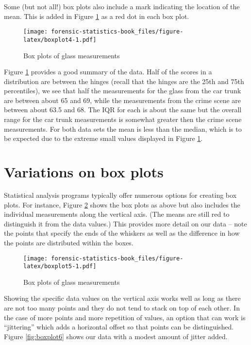 \documentclass[
]{book}
\begin{document}
Some (but not all!) box plots also include a mark indicating the location of
the mean. This is added in Figure \ref{fig:boxplot4} as a red dot in each
box plot.

\begin{figure}
\centering
\texttt{[image: forensic-statistics-book\_files/figure-latex/boxplot4-1.pdf]}
\caption{\label{fig:boxplot4}Box plots of glass measurements}
\end{figure}

Figure \ref{fig:boxplot4} provides a good summary of the data. Half of
the scores in a distribution are between the hinges (recall that the hinges are
the 25th and 75th percentiles), we see that half the measurements for the glass
from the car trunk are between about 65 and 69, while the measurements from the
crime scene are between about 63.5 and 68. The IQR for each is about the same
but the overall range for the car trunk measurements is somewhat greater
then the crime scene measurements. For both data sets the mean is less than
the median, which is to be expected due to the extreme small values displayed
in Figure \ref{fig:boxplot4}.

\hypertarget{variations-on-box-plots}{%
\section{Variations on box plots}\label{variations-on-box-plots}}

Statistical analysis programs typically offer numerous options for creating
box plots. For instance, Figure \ref{fig:boxplot5} shows the box plots
as above but also includes the individual measurements along the vertical
axis. (The means are still red to distinguish it from the data values.)
This provides more detail on our data -- note the points that specify
the ends of the whiskers as well as the difference in how the points are
distributed within the boxes.

\begin{figure}
\centering
\texttt{[image: forensic-statistics-book\_files/figure-latex/boxplot5-1.pdf]}
\caption{\label{fig:boxplot5}Box plots of glass measurements}
\end{figure}

Showing the specific data values on the vertical axis works well as long as there
are not too many points and they do not tend to stack on top of each other.
In the case of more points and more repetition of values, an option that can
work is ``jittering'' which adds a horizontal offset so that points can be
distinguished. Figure \ref{fig:boxplot6} shows our data with a modest
amount of jitter added.
\end{document}
